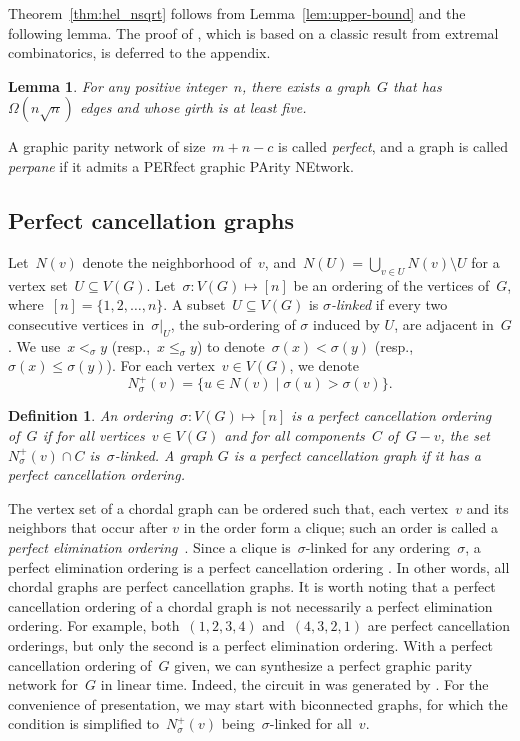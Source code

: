 \documentclass[a4paper,cleveref, autoref, 11pt, fleqn, thm-restate]{article}
\newcommand{\ptt}{perpane}
\theoremstyle{plain}
\newtheorem{lemma}[theorem]{Lemma}
\newtheorem*{definition}{Definition}
\begin{document}
Theorem~\ref{thm:hel_nsqrt} follows from Lemma~\ref{lem:upper-bound} and the following lemma.  The proof of , which is based on a classic result from extremal combinatorics, is deferred to the appendix.

\begin{lemma}\label{lem:girth-5}
  For any positive integer~$n$, there exists a graph~$G$ that has~$\Omega(n\sqrt{n})$ edges and whose girth is at least five.
\end{lemma}

A graphic parity network of size~$m+n-c$ is called \emph{perfect}, and a graph is called \emph{\ptt{}} if it admits a PERfect graphic PArity NEtwork.

\subsection{Perfect cancellation graphs}\label{sec:perfect-cancellation}

Let~$N(v)$ denote the neighborhood of~$v$, and~$N(U) = \bigcup_{v\in U} N(v) \setminus U$ for a vertex set~$U\subseteq V(G)$.
Let~$\sigma:V(G)\mapsto [n]$ be an ordering of the vertices of~$G$, where~$[n] = \{1, 2, \ldots, n\}$.
A subset~$U \subseteq V(G)$ is \emph{$\sigma$-linked} if every two consecutive vertices in~$\sigma|_{U}$, the sub-ordering of $\sigma$ induced by $U$, are adjacent in~$G$.
We use~$x <_\sigma y$ (resp.,~$x \le_\sigma y$) to denote~$\sigma(x) < \sigma(y)$ (resp.,~$\sigma(x) \le \sigma(y)$).
For each vertex~$v\in V(G)$, we denote
\[
  N^+_{\sigma}(v) = \{u\in N(v) \mid \sigma(u)>\sigma(v)\}.
\]

\begin{definition}
  An ordering~$\sigma:V(G)\mapsto[n]$ is a \emph{perfect cancellation ordering} of~$G$ if for all vertices~$v\in V(G)$ and for all components~$C$ of~$G - v$, the set~$N^+_{\sigma}(v)\cap C$ is~$\sigma$-linked.
  A graph $G$ is a \emph{perfect cancellation graph} if it has a perfect cancellation ordering.
\end{definition}


The vertex set of a chordal graph can be ordered such that, each vertex~$v$ and its neighbors that occur after $v$ in the order form a clique; such an order is called a \emph{perfect elimination ordering}~\cite{roseTriangulatedGraphsElimination1970}.
Since a clique is~$\sigma$-linked for any ordering~$\sigma$, a perfect elimination ordering is a perfect cancellation ordering \cite{roseTriangulatedGraphsElimination1970}.  In other words, all chordal graphs are perfect cancellation graphs.
It is worth noting that a perfect cancellation ordering of a chordal graph is not necessarily a perfect elimination ordering.
For example, both~$(1, 2, 3, 4)$ and~$(4, 3, 2, 1)$ are perfect cancellation orderings, but only the second is a perfect elimination ordering.
With a perfect cancellation ordering of~$G$ given, we can synthesize a perfect graphic parity network for~$G$ in linear time.  Indeed, the circuit in  was generated by .
For the convenience of presentation, we may start with biconnected graphs, for which the condition is simplified to~$N^+_{\sigma}(v)$ being~$\sigma$-linked for all~$v$.
\end{document}
